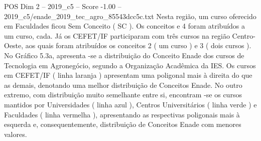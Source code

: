 \begin{textsample}{POS Dim 2 – 2019\_c5 – Score -1.00 – 2019\_c5/enade\_2019\_tec\_agro\_85543dcc5c.txt}
Nesta região, um curso oferecido em Faculdades ficou Sem Conceito ( SC ).
Os conceitos e 4 foram atribuídos a um curso, cada.
Já os CEFET/IF participaram com três cursos na região Centro-Oeste, aos quais foram atribuídos os conceitos 2 ( um curso ) e 3 ( dois cursos ).
No Gráfico 5.3a, apresenta -se a distribuição do Conceito Enade dos cursos de Tecnologia em Agronegócio, segundo a Organização Acadêmica da IES.
Os cursos em CEFET/IF ( linha laranja ) apresentam uma poligonal mais à direita do que as demais, denotando uma melhor distribuição de Conceitos Enade.
No outro extremo, com distribuição muito semelhante entre si, encontram -se os cursos mantidos por Universidades ( linha azul ), Centros Universitários ( linha verde ) e Faculdades ( linha vermelha ), apresentando as respectivas poligonais mais à esquerda e, consequentemente, distribuição de Conceitos Enade com menores valores.

\end{textsample}
